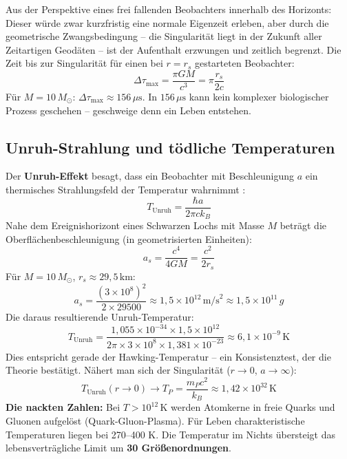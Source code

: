 ﻿\documentclass[12pt,a4paper]{report}
\begin{document}
Aus der Perspektive eines frei fallenden Beobachters innerhalb des Horizonts: Dieser würde zwar kurzfristig eine normale Eigenzeit erleben, aber durch die geometrische Zwangsbedingung -- die Singularität liegt in der Zukunft aller Zeitartigen Geodäten -- ist der Aufenthalt erzwungen und zeitlich begrenzt. Die Zeit bis zur Singularität für einen bei $r = r_s$ gestarteten Beobachter:
\begin{equation}
    \Delta\tau_{\text{max}} = \frac{\pi G M}{c^3} = \pi \frac{r_s}{2c}
    \label{eq:schwingungszeit_innen}
\end{equation}
Für $M = 10\,M_\odot$: $\Delta\tau_{\text{max}} \approx 156\,\mu\text{s}$. In $156\,\mu\text{s}$ kann kein komplexer biologischer Prozess geschehen -- geschweige denn ein Leben entstehen.

\subsection{Unruh-Strahlung und tödliche Temperaturen}

Der \textbf{Unruh-Effekt} besagt, dass ein Beobachter mit Beschleunigung $a$ ein thermisches Strahlungsfeld der Temperatur wahrnimmt \cite{unruh1976}:
\begin{equation}
    T_{\text{Unruh}} = \frac{\hbar a}{2\pi c k_B}
    \label{eq:unruh_temperatur}
\end{equation}
Nahe dem Ereignishorizont eines Schwarzen Lochs mit Masse $M$ beträgt die Oberflächenbeschleunigung (in geometrisierten Einheiten):
\begin{equation}
    a_s = \frac{c^4}{4GM} = \frac{c^2}{2r_s}
    \label{eq:oberflaechen_beschleunigung}
\end{equation}
Für $M = 10\,M_\odot$, $r_s \approx 29{,}5\,\text{km}$:
\begin{equation}
    a_s = \frac{(3 \times 10^8)^2}{2 \times 29500} \approx 1{,}5 \times 10^{12}\,\text{m/s}^2 \approx 1{,}5 \times 10^{11}\,g
    \label{eq:beschleunigung_zahlenwert}
\end{equation}
Die daraus resultierende Unruh-Temperatur:
\begin{equation}
    T_{\text{Unruh}} = \frac{1{,}055 \times 10^{-34} \times 1{,}5 \times 10^{12}}{2\pi \times 3 \times 10^8 \times 1{,}381 \times 10^{-23}} \approx 6{,}1 \times 10^{-9}\,\text{K}
    \label{eq:unruh_zahlenwert}
\end{equation}
Dies entspricht gerade der Hawking-Temperatur -- ein Konsistenztest, der die Theorie bestätigt. Nähert man sich der Singularität ($r \to 0$, $a \to \infty$):
\begin{equation}
    T_{\text{Unruh}}(r \to 0) \to T_P = \frac{m_P c^2}{k_B} \approx 1{,}42 \times 10^{32}\,\text{K}
    \label{eq:unruh_planck}
\end{equation}
\textbf{Die nackten Zahlen:} Bei $T > 10^{12}\,\text{K}$ werden Atomkerne in freie Quarks und Gluonen aufgelöst (Quark-Gluon-Plasma). Für Leben charakteristische Temperaturen liegen bei 270--400 K. Die Temperatur im Nichts übersteigt das lebensverträgliche Limit um \textbf{30 Größenordnungen}.
\end{document}
